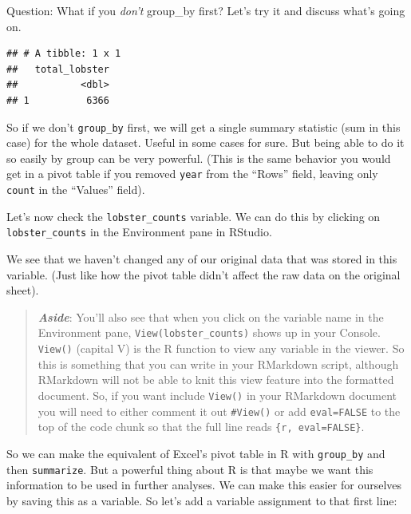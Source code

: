 \documentclass[]{book}
\newenvironment{Shaded}{\begin{snugshade}}{\end{snugshade}}
\newcommand{\DataTypeTok}[1]{\textcolor[rgb]{0.13,0.29,0.53}{#1}}
\newcommand{\KeywordTok}[1]{\textcolor[rgb]{0.13,0.29,0.53}{\textbf{#1}}}
\newcommand{\NormalTok}[1]{#1}
\newcommand{\OperatorTok}[1]{\textcolor[rgb]{0.81,0.36,0.00}{\textbf{#1}}}
\newcommand{\StringTok}[1]{\textcolor[rgb]{0.31,0.60,0.02}{#1}}
\begin{document}
Question: What if you \emph{don't} group\_by first? Let's try it and discuss what's going on.

\begin{Shaded}
\end{Shaded}

\begin{verbatim}
## # A tibble: 1 x 1
##   total_lobster
##           <dbl>
## 1          6366
\end{verbatim}

So if we don't \texttt{group\_by} first, we will get a single summary statistic (sum in this case) for the whole dataset. Useful in some cases for sure. But being able to do it so easily by group can be very powerful. (This is the same behavior you would get in a pivot table if you removed \texttt{year} from the ``Rows'' field, leaving only \texttt{count} in the ``Values'' field).

Let's now check the \texttt{lobster\_counts} variable. We can do this by clicking on \texttt{lobster\_counts} in the Environment pane in RStudio.

We see that we haven't changed any of our original data that was stored in this variable. (Just like how the pivot table didn't affect the raw data on the original sheet).

\begin{quote}
\textbf{\emph{Aside}}: You'll also see that when you click on the variable name in the Environment pane, \texttt{View(lobster\_counts)} shows up in your Console. \texttt{View()} (capital V) is the R function to view any variable in the viewer. So this is something that you can write in your RMarkdown script, although RMarkdown will not be able to knit this view feature into the formatted document. So, if you want include \texttt{View()} in your RMarkdown document you will need to either comment it out \texttt{\#View()} or add \texttt{eval=FALSE} to the top of the code chunk so that the full line reads \texttt{\{r,\ eval=FALSE\}}.
\end{quote}

So we can make the equivalent of Excel's pivot table in R with \texttt{group\_by} and then \texttt{summarize}. But a powerful thing about R is that maybe we want this information to be used in further analyses. We can make this easier for ourselves by saving this as a variable. So let's add a variable assignment to that first line:
\end{document}
